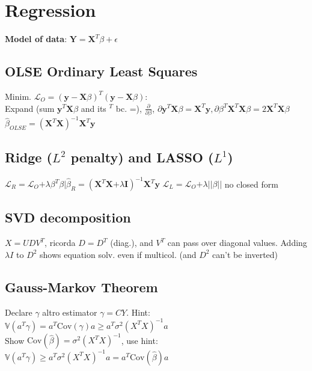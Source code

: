 \section*{Regression}
\textbf{Model of data}:
$\mathbf{Y}=\mathbf{X}^T\beta +\epsilon$

\subsection*{OLSE Ordinary Least Squares}
Minim.
$\mathcal{L}_O = (\mathbf{y}-\mathbf{X}\beta)^T(\mathbf{y}-\mathbf{X}\beta)$:\\
Expand (sum $\mathbf{y}^T\mathbf{X}\beta$ and its $^T$ bc. =), $\frac{\partial}{\partial\beta}$, $\partial\mathbf{y}^T\mathbf{X}\beta=\mathbf{X}^T\mathbf{y}, \partial\beta^T\textbf{X}^T\textbf{X}\beta=2\textbf{X}^T\textbf{X}\beta$ \\
$\hat\beta_{OLSE}=(\textbf{X}^T\textbf{X})^{-1}\textbf{X}^T\textbf{y}$


\subsection*{Ridge ($L^2$ penalty) and LASSO ($L^1$)}
$\mathcal{L}_R\mathrm{=}\mathcal{L}_O\mathrm{+}\lambda\beta^T\beta\mathrm{|}\hat\beta_{R}\mathrm{=}(\textbf{X}^T\textbf{X}\mathrm{+}\lambda\textbf{I})^{-1}\textbf{X}^T\textbf{y}$
$\mathcal{L}_L\mathrm{=}\mathcal{L}_O\mathrm{+}\lambda||\beta||$ no closed form
\subsection*{SVD decomposition}
$X=UDV^T$, ricorda $D\mathrm{=}D^T$ (diag.), and $V^T$ can pass over diagonal values. Adding $\lambda I$ to $D^2$ shows equation solv. even if multicol. (and $D^2$ can't be inverted)

\subsection*{Gauss-Markov Theorem}
Declare $\gamma$ altro estimator $\gamma = CY$. Hint:\\
$\mathbb{V}(a^T\gamma)\mathrm{=}a^T\mathrm{Cov}(\gamma)a\mathrm{\geq }a^T\sigma^2(X^TX)^{-1}a$ \\
Show $\mathrm{Cov}(\hat\beta)\mathrm{=}\sigma^2(X^TX)^{-1}$, use hint: \\
$\mathbb{V}(a^T\gamma)\mathrm{\geq }a^T\sigma^2(X^TX)^{-1}a\mathrm{=}a^T\mathrm{Cov}(\hat\beta)a$ \\

